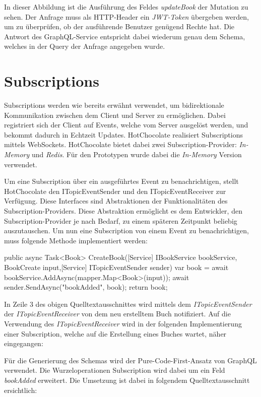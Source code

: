 In dieser Abbildung ist die Ausführung des Feldes \textit{updateBook} der Mutation zu sehen.
Der Anfrage muss als HTTP-Header ein \textit{JWT-Token} übergeben werden, um zu überprüfen, ob der ausführende Benutzer genügend Rechte hat.
Die Antwort des GraphQL-Service entspricht dabei wiederum genau dem Schema, welches in der Query der Anfrage angegeben wurde.


\section{Subscriptions}
Subscriptions werden wie bereits erwähnt verwendet, um bidirektionale Kommunikation zwischen dem Client und Server zu ermöglichen.
Dabei registriert sich der Client auf Events, welche vom Server ausgelöst werden, und bekommt dadurch in Echtzeit Updates.
HotChocolate realisiert Subscriptions mittels WebSockets.
HotChocolate bietet dabei zwei Subscription-Provider: \textit{In-Memory} und \textit{Redis}.
Für den Prototypen wurde dabei die \textit{In-Memory} Version verwendet.

Um eine Subscription über ein ausgeführtes Event zu benachrichtigen, stellt HotChocolate den ITopicEventSender und den ITopicEventReceiver zur Verfügung.
Diese Interfaces sind Abstraktionen der Funktionalitäten des Subscription-Providers.
Diese Abstraktion ermöglicht es dem Entwickler, den Subscription-Provider je nach Bedarf, zu einem späteren Zeitpunkt beliebig auszutauschen.
Um nun eine Subscription von einem Event zu benachrichtigen, muss folgende Methode implementiert werden:
\begin{JsCode}
public async Task<Book> CreateBook([Service] IBookService bookService, BookCreate input,[Service] ITopicEventSender sender) {
    var book = await bookService.AddAsync(mapper.Map<Book>(input));
    await sender.SendAsync("bookAdded", book);
    return book;
}
\end{JsCode}

In Zeile 3 des obigen Quelltextausschnittes wird mittels dem \textit{ITopicEventSender} der \textit{ITopicEventReceiver} von dem neu erstelltem Buch notifiziert.
Auf die Verwendung des \textit{ITopicEventReceiver} wird in der folgenden Implementierung einer Subscription, welche auf die Erstellung eines Buches wartet, näher eingegangen:

Für die Generierung des Schemas wird der Pure-Code-First-Ansatz von GraphQL verwendet.
Die Wurzeloperationen Subscription wird dabei um ein Feld \textit{bookAdded} erweitert.
Die Umsetzung ist dabei in folgendem Quelltextausschnitt ersichtlich:

